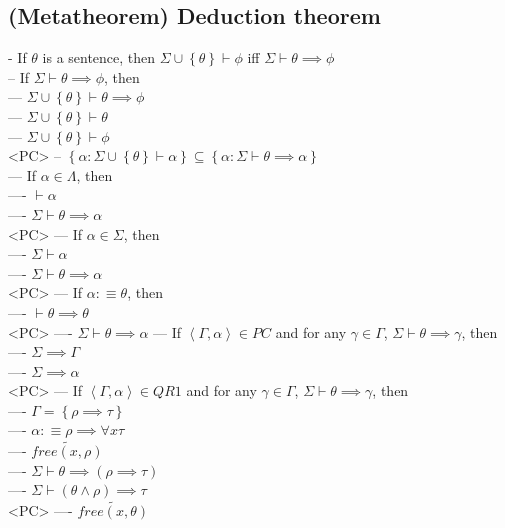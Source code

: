 \documentclass{book}
\newcommand{\is}{:\equiv}
\newcommand{\pnot}[1]{\widetilde{#1}}
\newcommand{\free}[2]{free(#1, #2)}
\newcommand{\set}[1]{\left\{ #1 \right\}}
\newcommand{\seq}[1]{\left\langle #1 \right\rangle}
\begin{document}
\subsection{(Metatheorem) Deduction theorem} %
	- If $\theta$ is a sentence, then $\Sigma \cup \set{\theta} \vdash \phi$ iff $\Sigma \vdash \theta \implies \phi$ \\
		-- If $\Sigma \vdash \theta \implies \phi$, then \\
			--- $\Sigma \cup \set{\theta} \vdash \theta \implies \phi$ \\
			--- $\Sigma \cup \set{\theta} \vdash \theta$ \\
			--- $\Sigma \cup \set{\theta} \vdash \phi$ \\ <PC>
		-- $\set{\alpha: \Sigma \cup \set{\theta} \vdash \alpha} \subseteq \set{\alpha: \Sigma \vdash \theta \implies \alpha}$ \\
			--- If $\alpha \in \Lambda$, then \\
				---- $\vdash \alpha$ \\
				---- $\Sigma \vdash \theta \implies \alpha$ \\ <PC>
			--- If $\alpha \in \Sigma$, then \\
				---- $\Sigma \vdash \alpha$ \\
				---- $\Sigma \vdash \theta \implies \alpha$ \\ <PC>
			--- If $\alpha \is \theta$, then \\
				---- $\vdash \theta \implies \theta$ \\ <PC>
				---- $\Sigma \vdash \theta \implies \alpha$
			--- If $\seq{\Gamma, \alpha} \in PC$ and for any $\gamma \in \Gamma$, $\Sigma \vdash \theta \implies \gamma$, then \\
				---- $\Sigma \implies \Gamma$ \\
				---- $\Sigma \implies \alpha$ \\ <PC>
			--- If $\seq{\Gamma, \alpha} \in QR1$ and for any $\gamma \in \Gamma$, $\Sigma \vdash \theta \implies \gamma$, then \\
				---- $\Gamma = \set{\rho \implies \tau}$ \\
				---- $\alpha \is \rho \implies \forall x \tau$ \\
				---- $\pnot{\free{x}{\rho}}$ \\
				---- $\Sigma \vdash \theta \implies (\rho \implies \tau)$ \\
				---- $\Sigma \vdash (\theta \land \rho) \implies \tau$ \\ <PC>
				---- $\pnot{\free{x}{\theta}}$ \\
\end{document}
